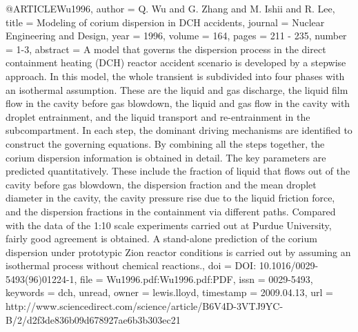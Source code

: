 {{@ARTICLE{Wu1996,
  author = {Q. Wu and G. Zhang and M. Ishii and R. Lee},
  title = {Modeling of corium dispersion in DCH accidents},
  journal = {Nuclear Engineering and Design},
  year = {1996},
  volume = {164},
  pages = {211 - 235},
  number = {1-3},
  abstract = {A model that governs the dispersion process in the direct containment
	heating (DCH) reactor accident scenario is developed by a stepwise
	approach. In this model, the whole transient is subdivided into four
	phases with an isothermal assumption. These are the liquid and gas
	discharge, the liquid film flow in the cavity before gas blowdown,
	the liquid and gas flow in the cavity with droplet entrainment, and
	the liquid transport and re-entrainment in the subcompartment. In
	each step, the dominant driving mechanisms are identified to construct
	the governing equations. By combining all the steps together, the
	corium dispersion information is obtained in detail. The key parameters
	are predicted quantitatively. These include the fraction of liquid
	that flows out of the cavity before gas blowdown, the dispersion
	fraction and the mean droplet diameter in the cavity, the cavity
	pressure rise due to the liquid friction force, and the dispersion
	fractions in the containment via different paths. Compared with the
	data of the 1:10 scale experiments carried out at Purdue University,
	fairly good agreement is obtained. A stand-alone prediction of the
	corium dispersion under prototypic Zion reactor conditions is carried
	out by assuming an isothermal process without chemical reactions.},
  doi = {DOI: 10.1016/0029-5493(96)01224-1},
  file = {Wu1996.pdf:Wu1996.pdf:PDF},
  issn = {0029-5493},
  keywords = {dch, unread},
  owner = {lewis.lloyd},
  timestamp = {2009.04.13},
  url = {http://www.sciencedirect.com/science/article/B6V4D-3VTJ9YC-B/2/d2f3de836b09d678927ae6b3b303ec21}
}

}}
